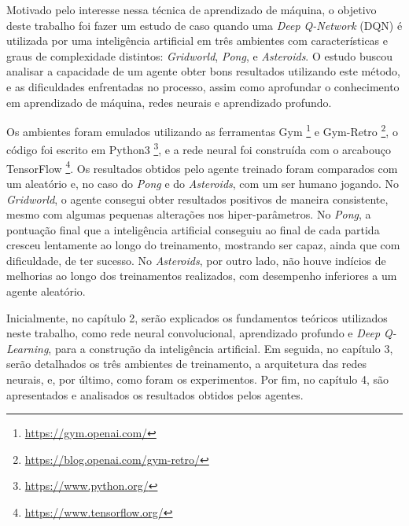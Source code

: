 Motivado pelo interesse nessa técnica de aprendizado de máquina, o objetivo deste trabalho foi fazer um estudo de caso quando uma \textit{Deep Q-Network} (DQN) é utilizada por uma inteligência artificial em três ambientes com características e graus de complexidade distintos: \textit{Gridworld}, \textit{Pong}, e \textit{Asteroids}.
O estudo buscou analisar a capacidade de um agente obter bons resultados utilizando este método, e as dificuldades enfrentadas no processo, assim como aprofundar o conhecimento em aprendizado de máquina, redes neurais e aprendizado profundo.

Os ambientes foram emulados utilizando as ferramentas Gym \footnote{\url{https://gym.openai.com/}} e Gym-Retro \footnote{\url{https://blog.openai.com/gym-retro/}}, o código foi escrito em Python3 \footnote{\url{https://www.python.org/}}, e a rede neural foi construída com o arcabouço TensorFlow \footnote{\url{https://www.tensorflow.org/}}.
Os resultados obtidos pelo agente treinado foram comparados com um aleatório e, no caso do \textit{Pong} e do \textit{Asteroids}, com um ser humano jogando.
No \textit{Gridworld}, o agente consegui obter resultados positivos de maneira consistente, mesmo com algumas pequenas alterações nos hiper-parâmetros.
No \textit{Pong}, a pontuação final que a inteligência artificial conseguiu ao final de cada partida cresceu lentamente ao longo do treinamento, mostrando ser capaz, ainda que com dificuldade, de ter sucesso.
No \textit{Asteroids}, por outro lado, não houve indícios de melhorias ao longo dos treinamentos realizados, com desempenho inferiores a um agente aleatório.

Inicialmente, no capítulo 2, serão explicados os fundamentos teóricos utilizados neste trabalho, como rede neural convolucional, aprendizado profundo e \textit{Deep Q-Learning}, para a construção da inteligência artificial.
Em seguida, no capítulo 3, serão detalhados os três ambientes de treinamento, a arquitetura das redes neurais, e, por último, como foram os experimentos.
Por fim, no capítulo 4, são apresentados e analisados os resultados obtidos pelos agentes.
